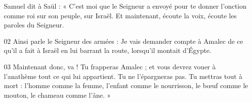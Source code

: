 Samuel dit à Saül : « C’est moi que le Seigneur a envoyé pour te donner l’onction comme roi sur son peuple, sur Israël. Et maintenant, écoute la voix, écoute les paroles du Seigneur.

02 Ainsi parle le Seigneur des armées : Je vais demander compte à Amalec de ce qu’il a fait à Israël en lui barrant la route, lorsqu’il montait d’Égypte.

03 Maintenant donc, va ! Tu frapperas Amalec ; et vous devrez vouer à l’anathème tout ce qui lui appartient. Tu ne l’épargneras pas. Tu mettras tout à mort : l’homme comme la femme, l’enfant comme le nourrisson, le bœuf comme le mouton, le chameau comme l’âne. »
